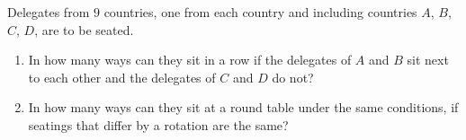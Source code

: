 Delegates from $9$ countries, one from each country and including countries $A$, $B$, $C$, $D$, are to be seated.
\begin{enumerate}
\item[(a)] In how many ways can they sit in a row if the delegates of $A$ and $B$ sit next to each other and the delegates of $C$ and $D$ do not?
\item[(b)] In how many ways can they sit at a round table under the same conditions, if seatings that differ by a rotation are the same?
\end{enumerate}
